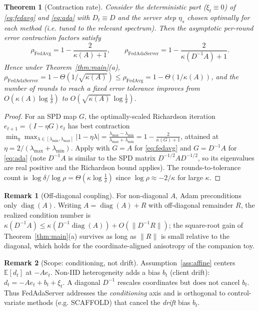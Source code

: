 \documentclass[11pt]{article}
\newtheorem{theorem}{Theorem}
\theoremstyle{definition}
\newtheorem{remark}{Remark}
\DeclareMathOperator{\diag}{diag}
\newcommand{\E}{\mathbb{E}}
\begin{document}
\begin{theorem}[Contraction rate]\label{thm:rate}
Consider the deterministic part ($\xi_t\equiv0$) of \eqref{eq:fedavg} and
\eqref{eq:ada} with $D_t\equiv D$ and the server step $\eta_s$ chosen optimally for
each method (i.e. tuned to the relevant spectrum). Then the asymptotic per-round
error contraction factors satisfy
\[
  \rho_{\mathrm{FedAvg}}=1-\frac{2}{\kappa(A)+1},\qquad
  \rho_{\mathrm{FedAdaServer}}=1-\frac{2}{\kappa(D^{-1}A)+1}.
\]
Hence under Theorem~\ref{thm:main}(a),
$\rho_{\mathrm{FedAdaServer}}=1-\Theta(1/\sqrt{\kappa(A)})\le
\rho_{\mathrm{FedAvg}}=1-\Theta(1/\kappa(A))$, and the number of rounds to reach a
fixed error tolerance improves from $O(\kappa(A)\log\frac1\delta)$ to
$O(\sqrt{\kappa(A)}\,\log\frac1\delta)$.
\end{theorem}

\begin{proof}
For an SPD map $G$, the optimally-scaled Richardson iteration
$e_{t+1}=(I-\eta G)e_t$ has best contraction
$\min_\eta\max_{\lambda\in[\lambda_{\min},\lambda_{\max}]}|1-\eta\lambda|
=\frac{\lambda_{\max}-\lambda_{\min}}{\lambda_{\max}+\lambda_{\min}}
=1-\frac{2}{\kappa(G)+1}$, attained at $\eta=2/(\lambda_{\max}+\lambda_{\min})$.
Apply with $G=A$ for \eqref{eq:fedavg} and $G=D^{-1}A$ for \eqref{eq:ada}
(note $D^{-1}A$ is similar to the SPD matrix $D^{-1/2}AD^{-1/2}$, so its
eigenvalues are real positive and the Richardson bound applies). The
rounds-to-tolerance count is $\log\delta/\log\rho=\Theta(\kappa\log\frac1\delta)$
since $\log\rho\approx-2/\kappa$ for large $\kappa$.
\end{proof}

\begin{remark}[Off-diagonal coupling]\label{rem:offdiag}
For non-diagonal $A$, Adam preconditions only $\diag(A)$. Writing
$A=\diag(A)+R$ with off-diagonal remainder $R$, the realized condition number is
$\kappa(D^{-1}A)\le\kappa(D^{-1}\diag(A))+O(\|D^{-1}R\|)$; the square-root gain of
Theorem~\ref{thm:main}(a) survives as long as $\|R\|$ is small relative to the
diagonal, which holds for the coordinate-aligned anisotropy of the companion toy.
\end{remark}

\begin{remark}[Scope: conditioning, not drift]
Assumption~\ref{ass:affine} centers $\E[d_t]$ at $-Ae_t$. Non-IID heterogeneity
adds a bias $b_t$ (client drift): $d_t=-Ae_t+b_t+\xi_t$. A diagonal $D^{-1}$
rescales coordinates but does not cancel $b_t$. Thus FedAdaServer addresses the
\emph{conditioning} axis and is orthogonal to control-variate methods (e.g.
SCAFFOLD) that cancel the \emph{drift} bias $b_t$.
\end{remark}
\end{document}

